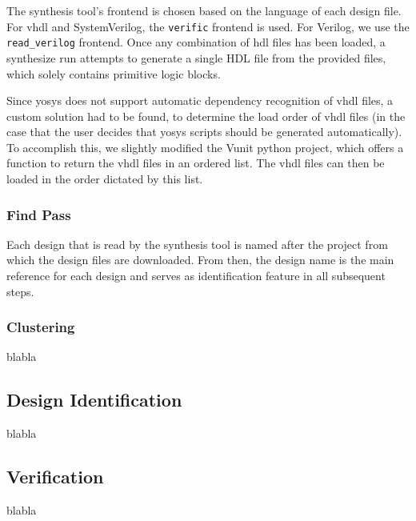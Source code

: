 The synthesis tool's frontend is chosen based on the language of each design file.
For \gls{vhdl} and SystemVerilog, the \lstinline{verific} frontend is used. For Verilog,
we use the \lstinline{read_verilog} frontend. Once any combination of \gls{hdl} files
has been loaded, a synthesize run attempts to generate a single HDL file from the provided
files, which solely contains primitive logic blocks. 

Since yosys does not support automatic dependency recognition of vhdl files, a custom solution
had to be found, to determine the load order of vhdl files (in the case that the user decides
that yosys scripts should be generated automatically). To accomplish this, we slightly modified 
the Vunit python project, which offers a function to return the \gls{vhdl} 
files in an ordered list. The vhdl files can then be loaded in the order dictated by this list.  

\subsubsection{Find Pass} 
Each design that is read by the synthesis tool is named after the project from
which the design files are downloaded. From then, the design name is the main
reference for each design and serves as identification feature in all
subsequent steps.

\subsubsection{Clustering}
blabla

\subsection{Design Identification}
blabla

\subsection{Verification}
blabla




